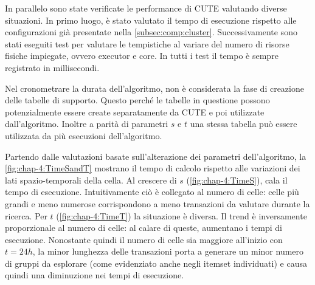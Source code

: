 In parallelo sono state verificate le performance di CUTE valutando diverse situazioni.
In primo luogo, è stato valutato il tempo di esecuzione rispetto alle configurazioni già presentate nella \cref{subsec:comp:cluster}.
Successivamente sono stati eseguiti test per valutare le tempistiche al variare del numero di risorse fisiche impiegate, ovvero executor e core.
In tutti i test il tempo è sempre registrato in millisecondi.

Nel cronometrare la durata dell'algoritmo, non è considerata la fase di creazione delle tabelle di supporto.
Questo perché le tabelle in questione possono potenzialmente essere create separatamente da CUTE e poi utilizzate dall'algoritmo.
Inoltre a parità di parametri \(s\) e \(t\) una stessa tabella può essere utilizzata da più esecuzioni dell'algoritmo.

Partendo dalle valutazioni basate sull'alterazione dei parametri dell'algoritmo, la \cref{fig:chap-4:TimeSandT} mostrano il tempo di calcolo rispetto alle variazioni dei lati spazio-temporali della cella.
Al crescere di \(s\) (\cref{fig:chap-4:TimeS}), cala il tempo di esecuzione.
Intuitivamente ciò è collegato al numero di celle: celle più grandi e meno numerose corrispondono a meno transazioni da valutare durante la ricerca.
Per \(t\) (\cref{fig:chap-4:TimeT}) la situazione è diversa.
Il trend è inversamente proporzionale al numero di celle: al calare di queste, aumentano i tempi di esecuzione.
Nonostante quindi il numero di celle sia maggiore all'inizio con \(t=24h\), la minor lunghezza delle transazioni porta a generare un minor numero di gruppi da esplorare (come evidenziato anche negli itemset individuati) e causa quindi una diminuzione nei tempi di esecuzione.

